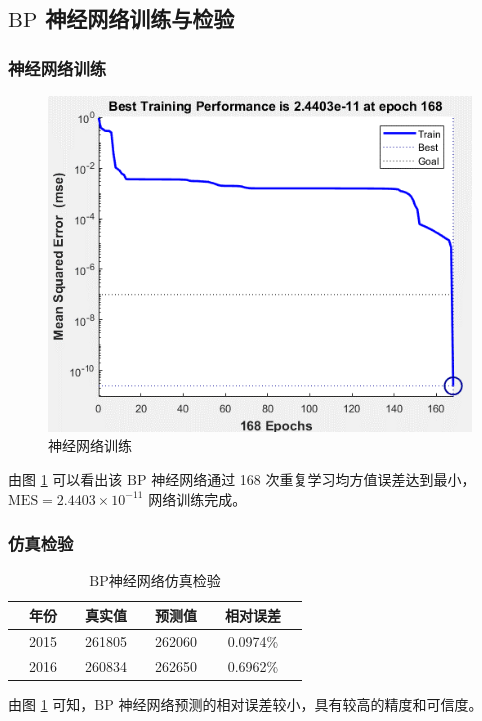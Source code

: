 \subsection{$\mathrm{BP}$ 神经网络训练与检验}

  \subsubsection{神经网络训练}
    \begin{figure}[htbp]
      \centering
      \includegraphics[width=0.618\paperwidth]{figures/muxinxunlian.png}
      \caption{神经网络训练}
      \label{fig:wanluoxunlian}
    \end{figure}
    由图 \ref{fig:wanluoxunlian} 可以看出该 $\mathrm{BP}$ 神经网络通过 168 次重复学习均方值误差达到最小，$\mathrm{MES}=2.4403\times 10^{-11}$ 网络训练完成。

  \subsubsection{仿真检验}
    \begin{table}[htb]
      \centering
      \caption{$\mathrm{BP}$神经网络仿真检验}
      \begin{tabular*}{0.618\paperwidth}{@{\extracolsep{\fill}}ccccccccc}
        \toprule[1.5pt]
        &年份 && 真实值 && 预测值 && 相对误差 &\\
        \midrule[1pt]
        &2015 && 261805 && 262060 && 0.0974\% &\\
        &2016 && 260834 && 262650 && 0.6962\% &\\
        \bottomrule[1.5pt]
      \end{tabular*}
      \label{tab:fanzhenjianyan}
    \end{table}
    由图 \ref{tab:fanzhenjianyan} 可知，$\mathrm{BP}$ 神经网络预测的相对误差较小，具有较高的精度和可信度。